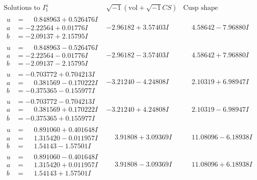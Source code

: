 \documentclass[1p]{elsarticle_modified}
\theoremstyle{definition}
\newcommand{\I}{\sqrt{-1}}
\begin{document}
$$\begin{array}{c|c|c}  
\text{Solutions to }I^u_{1}& \I (\text{vol} + \sqrt{-1}CS) & \text{Cusp shape}\\
 \hline 
\begin{aligned}
u &= \phantom{-}0.848963 + 0.526476 I \\
a &= -2.22564 + 0.01776 I \\
b &= -2.09137 + 2.15795 I\end{aligned}
 & -2.96182 + 3.57403 I & \phantom{-}4.58642 - 7.96880 I \\ \hline\begin{aligned}
u &= \phantom{-}0.848963 - 0.526476 I \\
a &= -2.22564 - 0.01776 I \\
b &= -2.09137 - 2.15795 I\end{aligned}
 & -2.96182 - 3.57403 I & \phantom{-}4.58642 + 7.96880 I \\ \hline\begin{aligned}
u &= -0.703772 + 0.704213 I \\
a &= \phantom{-}0.381569 - 0.170222 I \\
b &= -0.375365 - 0.155977 I\end{aligned}
 & -3.21240 - 4.24808 I & \phantom{-}2.10319 + 6.98947 I \\ \hline\begin{aligned}
u &= -0.703772 - 0.704213 I \\
a &= \phantom{-}0.381569 + 0.170222 I \\
b &= -0.375365 + 0.155977 I\end{aligned}
 & -3.21240 + 4.24808 I & \phantom{-}2.10319 - 6.98947 I \\ \hline\begin{aligned}
u &= \phantom{-}0.891060 + 0.401648 I \\
a &= \phantom{-}1.315420 - 0.011957 I \\
b &= \phantom{-}1.54143 - 1.57501 I\end{aligned}
 & \phantom{-}3.91808 + 3.09369 I & \phantom{-}11.08096 - 6.18938 I \\ \hline\begin{aligned}
u &= \phantom{-}0.891060 - 0.401648 I \\
a &= \phantom{-}1.315420 + 0.011957 I \\
b &= \phantom{-}1.54143 + 1.57501 I\end{aligned}
 & \phantom{-}3.91808 - 3.09369 I & \phantom{-}11.08096 + 6.18938 I \\ \hline\begin{aligned}

\end{aligned}
\end{array}$$
\end{document}
